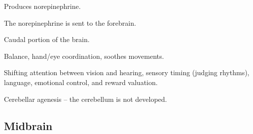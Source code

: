 \begin{coloredlist}
\begin{coloredlist}
\begin{coloredlist}
            \begin{coloredlist}
                \item Produces norepinephrine.
                \item The norepinephrine is sent to the forebrain.
            \end{coloredlist}
        \end{coloredlist}
        \item {}
        \begin{coloredlist}
            \item Caudal portion of the brain.
            \item Balance, hand/eye coordination, soothes movements.
            \item Shifting attention between vision and hearing, sensory timing (judging rhythms), language, emotional control, and reward valuation.
            \item Cerebellar agenesis -- the cerebellum is not developed.
        \end{coloredlist}
    \end{coloredlist}
\end{coloredlist}

\subsection{Midbrain}

